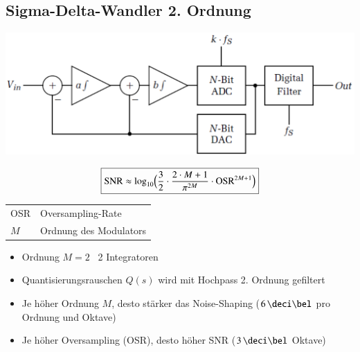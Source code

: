 \subsection{Sigma-Delta-Wandler 2. Ordnung}

\begin{minipage}[c]{0.48\columnwidth}
    \includegraphics[width=\columnwidth]{images/sigma-delta-wandler_ordnung_2.png}
\end{minipage}
\hfill
\begin{minipage}[c]{0.48\columnwidth}
    $$ \boxed{ \text{SNR} \approx \log_{10} \Bigl( \frac{3}{2} \cdot \frac{2 \cdot M + 1}{\pi^{2M}} \cdot \text{OSR}^{2M+1} \Bigr) } $$
    \begin{tabular}{ll}
        OSR & Oversampling-Rate \\
        $M$ & Ordnung des Modulators
    \end{tabular}
\end{minipage}

\begin{itemize}
    \item Ordnung $M = 2$ \textrightarrow\ 2 Integratoren
    \item Quantisierungsrauschen $Q(s)$ wird mit Hochpass 2. Ordnung gefiltert
    \item Je höher Ordnung $M$, desto stärker das Noise-Shaping ($6 \, \deci \bel$ pro Ordnung und Oktave)
    \item Je höher Oversampling (OSR), desto höher SNR ($3 \, \deci \bel$ Oktave)
\end{itemize}